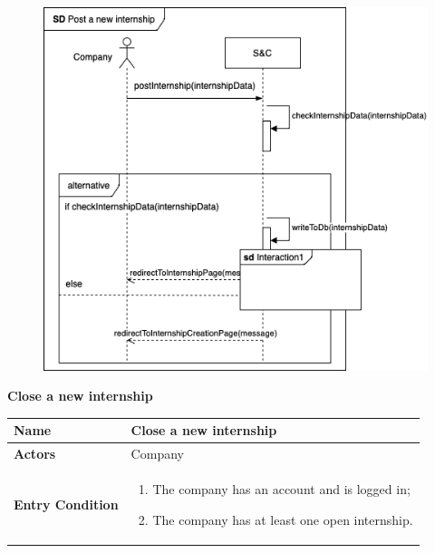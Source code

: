 \begin{enumerate}[label=\textbf{[US\arabic*]}, left = 0pt, align = left, resume]
\begin{longtable}{|l|p{11cm}|}
            \end{longtable}

            \begin{figure}[h!]
                \centering
                    \includegraphics[width=1\textwidth]{RASD/Images/UseCases/PostNewInternship.drawio.png}
                \label{fig:example}
                \end{figure}

            \newpage
            \item \textbf{Close a new internship}
            
            \begin{longtable}{|l|p{11cm}|}  
                \hline
                \textbf{Name} & 
                    \textbf{Close a new internship} \\
                \hline
                
                \textbf{Actors} & 
                    Company \\
                \hline
                
                \textbf{Entry Condition} & 
                    \begin{enumerate}[label=\textbullet, itemsep=0em]
                        \item The company has an account and is logged in;
                        \item The company has at least one open internship.
                    \end{enumerate} \\
                \hline 
                

\end{longtable}
\end{enumerate}
